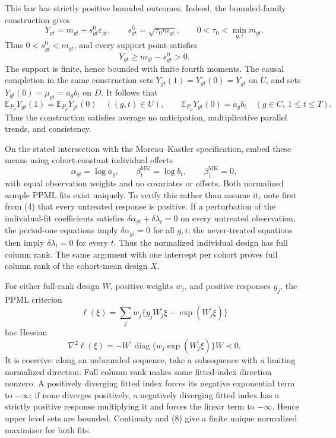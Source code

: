 This law has strictly positive bounded outcomes.  Indeed, the bounded-family construction gives
\[
Y_{gt}=m_{gt}+s^0_{gt}\varepsilon_{gt},
\qquad
s^0_{gt}=\sqrt{\tau_0m_{gt}},
\qquad
0<\tau_0<\min_{g,t}m_{gt}.                                               \tag{3}
\]
Thus \(0<s^0_{gt}<m_{gt}\), and every support point satisfies
\[
Y_{gt}\ge m_{gt}-s^0_{gt}>0.                                           \tag{4}
\]
The support is finite, hence bounded with finite fourth moments.  The causal completion in the same construction sets
\(Y_{gt}(1)=Y_{gt}(0)=Y_{gt}\) on \(U\), and sets
\(Y_{gt}(0)=\mu_{gt}=a_gb_t\) on \(D\).  It follows that
\[
\mathbb E_{P_\rho}Y_{gt}(1)=\mathbb E_{P_\rho}Y_{gt}(0)
\quad((g,t)\in U),
\qquad
\mathbb E_{P_\rho}Y_{gt}(0)=a_gb_t
\quad(g\in C,\ 1\le t\le T).                                         \tag{5}
\]
Thus the construction satisfies average no anticipation, multiplicative parallel trends, and consistency.

On the stated intersection with the Moreau--Kastler specification, embed these means using cohort-constant individual effects
\[
\alpha_{gi}=\log a_g,
\qquad
\beta_t^{\mathrm{MK}}=\log b_t,
\qquad
\beta_1^{\mathrm{MK}}=0,                                                \tag{6}
\]
with equal observation weights and no covariates or offsets.  Both normalized sample PPML fits exist uniquely.  To verify this rather than assume it, note first from (4) that every untreated response is positive.  If a perturbation of the individual-fit coefficients satisfies
\(\delta\alpha_{gi}+\delta\lambda_t=0\) on every untreated observation, the period-one equations imply
\(\delta\alpha_{gi}=0\) for all \(g,i\); the never-treated equations then imply
\(\delta\lambda_t=0\) for every \(t\).  Thus the normalized individual design has full column rank.  The same argument with one intercept per cohort proves full column rank of the cohort-mean design \(X\).

For either full-rank design \(W\), positive weights \(w_j\), and positive responses \(y_j\), the PPML criterion
\[
\ell(\xi)=\sum_jw_j\{y_jW_j^{\prime}\xi-\exp(W_j^{\prime}\xi)\}     \tag{7}
\]
has Hessian
\[
\nabla^2\ell(\xi)
=-W^{\prime}\operatorname{diag}\{w_j\exp(W_j^{\prime}\xi)\}W\prec0. \tag{8}
\]
It is coercive: along an unbounded sequence, take a subsequence with a limiting normalized direction.  Full column rank makes some fitted-index direction nonzero.  A positively diverging fitted index forces its negative exponential term to \(-\infty\); if none diverges positively, a negatively diverging fitted index has a strictly positive response multiplying it and forces the linear term to \(-\infty\).  Hence upper level sets are bounded.  Continuity and (8) give a finite unique normalized maximizer for both fits.

